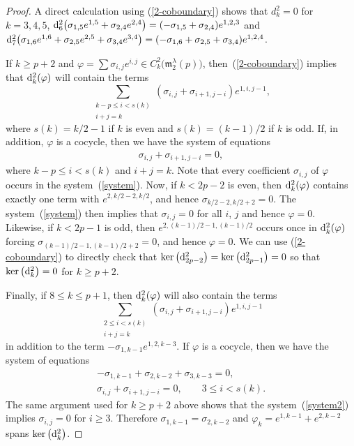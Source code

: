 \documentclass[pdftex]{sigma}
\def\phi{\varphi}
\def\m{\mathfrak m}
\numberwithin{equation}{section}
\begin{document}
\begin{proof} A direct calculation using (\ref{2-coboundary}) shows that $d^2_k=0$ for $k=3,4,5$, ${\rm d}^2_6\big(\sigma_{1,5}e^{1,5} +\sigma_{2,4}e^{2,4}\big)=(-\sigma_{1,5}+\sigma_{2,4})e^{1,2,3}$ and ${\rm d}^2_7\big(\sigma_{1,6}e^{1,6} +\sigma_{2,5}e^{2,5}+\sigma_{3,4}e^{3,4}\big) =(-\sigma_{1,6} +\sigma_{2,5} +\sigma_{3,4})e^{1,2,4}$.

If $k\ge p+2$ and $\phi=\sum \sigma_{i,j} e^{i,j}\in C^2_k\big(\m_2^\lambda(p)\big)$, then~(\ref{2-coboundary}) implies that ${\rm d}^2_k(\phi)$ will contain the
 terms
 \[\sum_{\substack{k-p\le i< s(k)\\ i+j=k}} (\sigma_{i,j}+\sigma_{i+1,j-i})e^{1,i,j-1},\] where $s(k)=k/2-1$
 if $k$ is even and $s(k)=(k-1)/2$ if $k$ is odd. If, in addition, $\phi$ is a cocycle, then we have the system of equations
 \begin{gather} \label{system}
 \sigma_{i,j}+\sigma_{i+1,j-i} = 0,
 \end{gather}
where $k-p\le i< s(k)$ and $i+j=k$. Note that every coefficient $\sigma_{i,j}$ of $\phi$ occurs in the system~(\ref{system}). Now, if $k<2p-2$ is even, then ${\rm d}^2_k(\phi)$ contains exactly one term with $e^{2,k/2-2,k/2}$, and hence $\sigma_{k/2-2,k/2+2}=0$. The system~(\ref{system}) then implies that $\sigma_{i,j}=0$ for all $i$, $j$ and hence $\phi=0$. Likewise, if $k<2p-1$ is odd, then $e^{2,(k-1)/2-1,(k-1)/2}$ occurs once in ${\rm d}^2_k(\phi)$ forcing $\sigma_{(k-1)/2-1,(k-1)/2+2}=0$, and hence $\phi=0$. We can use (\ref{2-coboundary}) to directly check that $\ker \big({\rm d}^2_{2p-2}\big)=\ker \big({\rm d}^2_{2p-1}\big)=0$ so that $\ker \big({\rm d}^2_k\big)=0$ for
 $k\ge p+2$.

Finally, if $8\le k\le p+1$, then ${\rm d}^2_k(\phi)$ will also contain the terms
 \[\sum_{\substack{2\le i< s(k)\\ i+j=k}}
 (\sigma_{i,j}+\sigma_{i+1,j-i})e^{1,i,j-1}\] in addition to the term $-\sigma_{1,k-1}e^{1,2,k-3}$. If $\phi$ is a cocycle, then we
 have the system of equations
 \begin{gather}
 -\sigma_{1,k-1}+\sigma_{2,k-2}+\sigma_{3,k-3} =0,\nonumber\\
 \sigma_{i,j}+\sigma_{i+1,j-i} = 0, \qquad 3\le i < s(k).\label{system2}
 \end{gather}
 The same argument used for $k\ge p+2$ above shows that the system~(\ref{system2}) implies $\sigma_{i,j}=0$ for $i\ge 3$. Therefore $\sigma_{1,k-1}=\sigma_{2,k-2}$ and $\phi_k=e^{1,k-1}+e^{2,k-2}$ spans $\ker \big({\rm d}^2_k\big)$.
\end{proof}
\end{document}
